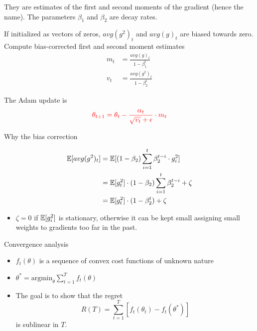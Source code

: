 \documentclass[english]{article}
\begin{document}
They are estimates of the first and second moments of the gradient (hence the name). The parameters $\beta_1$ and $\beta_2$ are decay rates.











If initialized as vectors of zeros, $avg(g^2)_t $ and $avg(g)_t$ are biased towards zero. Compute bias-corrected first and second moment estimates
\begin{align*}
m_t &= \frac{avg(g)_t}{1-\beta_1^t} \\
v_t &= \frac{avg(g^2)_t}{1 - \beta_2^t}
\end{align*}  

The Adam update is
$$\textcolor{red}{\theta_{t+1} = \theta_t - \frac{\alpha_t}{\sqrt{v_t} + \epsilon} \cdot m_t}$$










\item {Why the bias correction}

\begin{align*}
\mathbb{E}[avg(g^2)_t] &= \mathbb{E}[(1- \beta_2) \sum_{i=1}^t \beta_2^{t-i} \cdot g_i^2]\\ 
&= \mathbb{E}[g^2_t] \cdot (1- \beta_2) \sum_{i=1}^t \beta_2^{t-i} + \zeta \\
&= \mathbb{E}[g^2_t] \cdot (1- \beta_2^t) + \zeta
\end{align*}


\begin{itemize}
\item $\zeta = 0$ if $\mathbb{E}[g_i^2]$ is stationary, otherwise it can be kept small assigning small weights to gradients too far in the past.
\end{itemize}








\item {Convergence analysis}
\begin{itemize}
\item $f_t(\theta)$ is a sequence of convex cost functions of unknown nature 
\item $\theta^* = \text{argmin}_\theta \sum_{t=1}^T f_t(\theta)$ 
\item The goal is to show that the regret
$$R(T) = \sum_{t=1}^T [f_t(\theta_t) - f_t(\theta^*)]$$
is sublinear in $T$.
\end{itemize}
\end{document}
